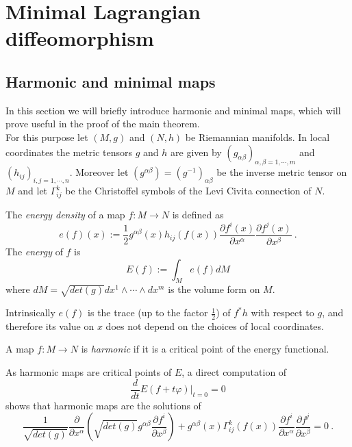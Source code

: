\chapter{Minimal Lagrangian diffeomorphism}

\section{Harmonic and minimal maps}
In this section we will briefly introduce harmonic and minimal maps, which will prove useful in the proof of the main theorem.\\
For this purpose let $(M,g)$ and $(N,h)$ be Riemannian manifolds. In local coordinates the metric tensors $g$ and $h$ are given by $(g_{\alpha \beta})_{\alpha,\beta = 1,\cdots, m}$ and $(h_{ij})_{i,j= 1,\cdots,n}$. Moreover let $(g^{\alpha \beta}) = (g^{-1})_{\alpha \beta}$ be the inverse metric tensor on $M$ and let $\Gamma^k_{ij}$ be the Christoffel symbols of the Levi Civita connection of $N$.\\
\begin{definition}
    The \textit{energy density} of a map $f:M \to N$ is defined as
    \begin{equation}
        e(f)(x) := \frac{1}{2} g^{\alpha \beta}(x)h_{ij}(f(x)) \frac{\partial f^i (x)}{\partial x^\alpha}  \frac{\partial f^j (x)}{\partial x^\beta} \ .
    \end{equation}
    The \textit{energy} of $f$ is
    \begin{equation}
        E(f) := \int_M e(f)dM
    \end{equation}
    where $dM = \sqrt{det(g)} dx^1 \wedge \cdots \wedge dx^m$ is the volume form on $M$.
\end{definition}
\begin{observation}
    Intrinsically $e(f)$ is the trace (up to the factor $\frac{1}{2}$) of $f^* h$ with respect to $g$, and therefore its value on $x$ does not depend on the choices of local coordinates.
\end{observation}
\begin{definition}
    A map $f:M\to N$ is \textit{harmonic} if it is a critical point of the energy functional.
\end{definition}
As harmonic maps are critical points of $E$, a direct computation of
\[
    \frac{d}{dt}E(f+ t\varphi) |_{t=0} = 0
\]
shows that harmonic maps are the solutions of
\begin{equation} \label{eq:harmonic}
    \frac{1}{\sqrt{det(g)}} \frac{\partial}{\partial x^\alpha}(\sqrt{det(g)} g^{\alpha\beta} \frac{\partial f^i}{\partial x^\beta}) + g^{\alpha\beta}(x) \Gamma^k_{ij}(f(x)) \frac{\partial f^i}{\partial x^\alpha}  \frac{\partial f^j}{\partial x^\beta} = 0 \ .
\end{equation}
